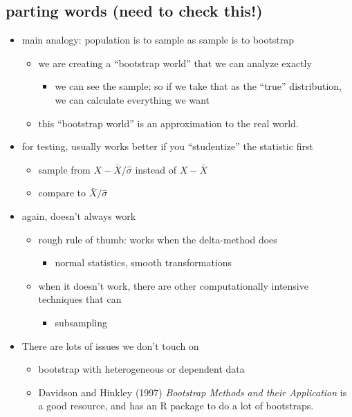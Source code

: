 \subsection{parting words (need to check this!)}
\label{sec-2-3}

\begin{itemize}
\item main analogy: population is to sample as sample is to bootstrap
\begin{itemize}
\item we are creating a ``bootstrap world'' that we can analyze
         exactly
\begin{itemize}
\item we can see the sample; so if we take that as the ``true''
           distribution, we can calculate everything we want
\end{itemize}
\item this ``bootstrap world'' is an approximation to the real world.
\end{itemize}
\item for testing, usually works better if you ``studentize'' the
       statistic first
\begin{itemize}
\item sample from $X - \bar X / \hat\sigma$ instead of $X - \bar X$
\item compare to $\bar X / \hat\sigma$
\end{itemize}
\item again, doesn't always work
\begin{itemize}
\item rough rule of thumb: works when the delta-method does
\begin{itemize}
\item normal statistics, smooth transformations
\end{itemize}
\item when it doesn't work, there are other computationally
         intensive techniques that can
\begin{itemize}
\item subsampling
\end{itemize}
\end{itemize}
\item There are lots of issues we don't touch on
\begin{itemize}
\item bootstrap with heterogeneous or dependent data
\item Davidson and Hinkley (1997) \emph{Bootstrap Methods and their
    Application} is a good resource, and has an R package to do a lot
  of bootstraps.
\end{itemize}
\end{itemize}